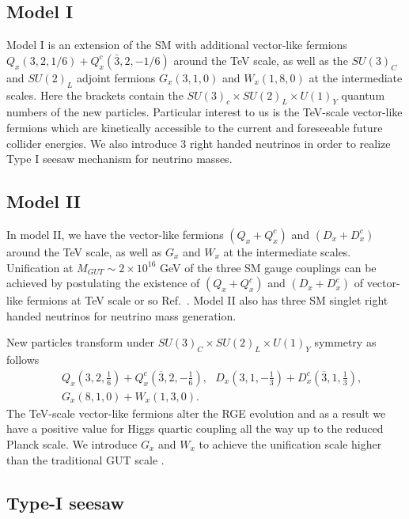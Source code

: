 \documentclass[aps,prd,preprint,superscriptaddress,showpacs,ctexart]{revtex4-1}
\begin{document}

\subsection{Model I}

Model I is an extension of the SM with additional vector-like fermions
$Q_{x}(3,2,1/6)+Q_{x}^{c}(\bar{3},2,-1/6)$ around the TeV scale,
as well as the $SU(3)_{C}$ and $SU(2)_{L}$ adjoint fermions $G_{x}(3,1,0)$
and $W_{x}(1,8,0)$ at the intermediate scales. Here the brackets
contain the $SU(3)_{c}\times SU(2)_{L}\times U(1)_{Y}$ quantum numbers
of the new particles. Particular interest to us is the TeV-scale vector-like
fermions which are kinetically accessible to the current and foreseeable
future collider energies. We also introduce 3 right handed neutrinos 
in order to realize Type I seesaw mechanism for neutrino masses.

\subsection{Model II}

In model II, we have the vector-like fermions $(Q_{x}+Q_{x}^{c})$
and $(D_{x}+D_{x}^{c})$ around the TeV scale, as well as $G_{x}$
and $W_{x}$ at the intermediate scales. Unification at $M_{GUT}\sim2\times10^{16}$
GeV of the three SM gauge couplings can be achieved by postulating
the existence of $(Q_{x}+Q_{x}^{c})$ and $(D_{x}+D_{x}^{c})$ of
 vector-like fermions at TeV scale or so Ref.~\cite{GCU,Chen:2017rpn}.
Model II also has three SM singlet right handed neutrinos for neutrino
mass generation.

New particles transform under
$SU(3)_{C}\times SU(2)_{L}\times U(1)_{Y}$ symmetry as follows
\begin{eqnarray*}
 &  & Q_{x}\left(3,2,\frac{1}{6}\right)+Q_{x}^{c}\left(\overline{3},2,-\frac{1}{6}\right),~~~D_{x}\left(3,1,-\frac{1}{3}\right)+D_{x}^{c}\left(\overline{3},1,\frac{1}{3}\right),~~\\
 &  & G_{x}\left(8,1,0\right)+W_{x}(1,3,0).~\,
\end{eqnarray*}
The TeV-scale vector-like fermions alter the RGE evolution and as
a result we have a positive value for Higgs quartic coupling all the way
up to the reduced Planck scale. We introduce $G_{x}$ and $W_{x}$
to achieve the unification scale higher than the traditional GUT scale
\cite{Haba:2014oxa}.

\subsection{Type-I seesaw}
\end{document}
